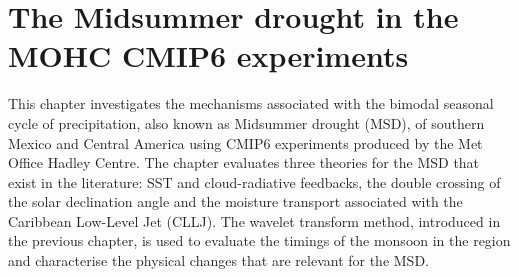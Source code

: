 
\chapter{\label{ch:6-msd}The Midsummer drought in the MOHC CMIP6 experiments}

This chapter investigates the mechanisms associated with  the bimodal seasonal cycle of precipitation, also known as Midsummer drought (MSD), of southern Mexico and Central America using CMIP6 experiments produced by the Met Office Hadley Centre.
The chapter evaluates three theories for the MSD that exist in the literature: SST and cloud-radiative feedbacks, the double crossing of the solar declination angle and the moisture transport associated with the Caribbean Low-Level 
Jet (CLLJ). 
The wavelet transform method, introduced in the previous chapter, is used to evaluate the timings of the monsoon in the region and characterise the physical changes that are relevant for the MSD.
